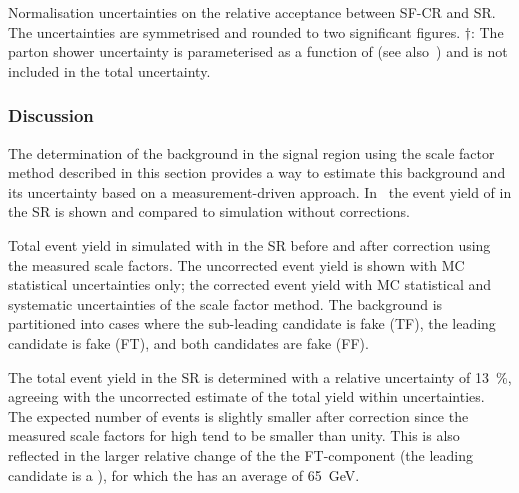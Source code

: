\begin{table}[htbp]
  \centering

  \caption{Normalisation uncertainties on the relative acceptance
    between SF-CR and SR. The uncertainties are symmetrised and
    rounded to two significant figures. $\dagger$: The parton shower
    uncertainty is parameterised as a function of \tauhadvis \pT (see
    also~) and is not included in the
    total uncertainty.}%
  \label{tab:ttbarSF_acceptance_uncertainty}

  
\end{table}


\subsubsection{Discussion}

The determination of the \ttbarFakes background in the \hadhad signal region
using the scale factor method described in this section provides a way to
estimate this background and its uncertainty based on a measurement-driven
approach. In~ the event yield of \ttbarFakes in the
\hadhad SR is shown and compared to \ttbar simulation without corrections.

\begin{table}[htbp]
  \centering

  \caption{Total event yield in simulated \ttbar with \faketauhadvis
    in the \hadhad SR before and after correction using the measured
    scale factors. The uncorrected event yield is shown with MC
    statistical uncertainties only; the corrected event yield with MC
    statistical and systematic uncertainties of the scale factor
    method. The \ttbarFakes background is partitioned into cases where
    the \pT sub-leading \tauhadvis candidate is fake (TF), the leading
    candidate is fake (FT), and both candidates are fake (FF).}%
  \label{tab:ttbarSF_yields}

  
\end{table}

The total \ttbarFakes event yield in the \hadhad SR is determined with
a relative uncertainty of \SI{13}{\percent}, agreeing with the
uncorrected estimate of the total yield within uncertainties. The
expected number of \ttbarFakes events is slightly smaller after
correction since the measured scale factors for high \pT
\faketauhadvis tend to be smaller than unity. This is also reflected
in the larger relative change of the the FT-component (the leading
\tauhadvis candidate is a \faketauhadvis), for which the
\faketauhadvis has an average \pT of \SI{65}{\GeV}.

